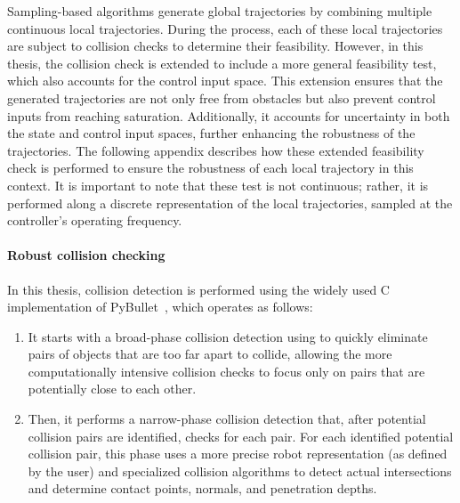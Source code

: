 

Sampling-based algorithms generate global trajectories by combining multiple continuous local trajectories.
During the process, each of these local trajectories are subject to collision checks to determine their feasibility.
However, in this thesis, the collision check is extended to include a more general feasibility test, which also accounts for the control input space. 
This extension ensures that the generated trajectories are not only free from obstacles but also prevent control inputs from reaching saturation. 
Additionally, it accounts for uncertainty in both the state and control input spaces, further enhancing the robustness of the trajectories.
The following appendix describes how these extended feasibility check is performed to ensure the robustness of each local trajectory in this context.
It is important to note that these test is not continuous; rather, it is performed along a discrete representation of the local trajectories, sampled at the controller's operating frequency.

\paragraph{Robust collision checking}

In this thesis, collision detection is performed using the widely used C implementation of PyBullet~\cite{cBullet}, which operates as follows: 
\begin{enumerate}
    \item It starts with a broad-phase collision detection using  to quickly eliminate pairs of objects that are too far apart to collide, allowing the more computationally intensive collision checks to focus only on pairs that are potentially close to each other.
    \item Then, it performs a narrow-phase collision detection that, after potential collision pairs are identified, checks for each pair. 
    For each identified potential collision pair, this phase uses a more precise robot representation (as defined by the user) and specialized collision algorithms to detect actual intersections and determine contact points, normals, and penetration depths.
\end{enumerate}

